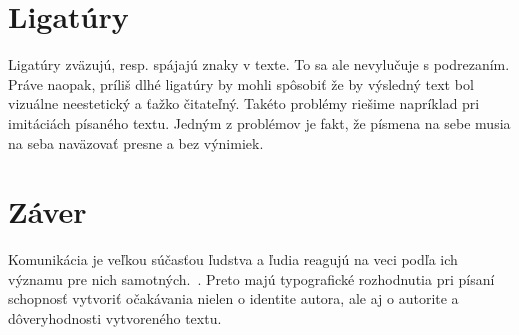 \documentclass[11pt]{article}
\begin{document}
\section{Ligatúry}
Ligatúry zväzujú, resp. spájajú znaky v texte. To sa ale nevylučuje s podrezaním. Práve naopak, príliš dlhé ligatúry by mohli spôsobiť že by výsledný text bol vizuálne neestetický a ťažko čitateľný. 
Takéto problémy riešime napríklad pri imitáciách písaného textu. Jedným z problémov je fakt, že písmena na sebe musia na seba naväzovať presne a bez výnimiek.~\cite{Slabikar}

\section*{Záver}
Komunikácia je veľkou súčasťou ľudstva a ľudia reagujú na veci podľa ich významu pre nich samotných.~\cite{thisIsNotFair}. Preto majú typografické rozhodnutia pri písaní schopnosť vytvoriť očakávania nielen o identite autora, ale aj o autorite a dôveryhodnosti vytvoreného textu.~\cite{AUTUniversity} 
\newpage


\end{document}
